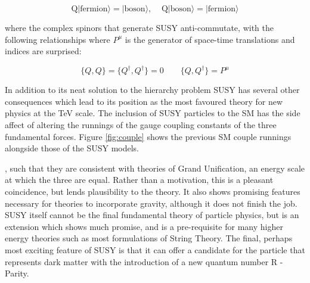 \begin{equation}
\textrm{Q}|\textrm{fermion}\rangle = |\textrm{boson}\rangle,  \; \; \; \;  \textrm{Q}|\textrm{boson}\rangle = |\textrm{fermion}\rangle  
\label{eqn:Q}
\end{equation}

where the complex spinors that generate SUSY anti-commutate, with the following relationships where $P^{\mu}$ is the generator of space-time translations and indices are surprised:


\begin{equation}
\{Q,Q\} = \{Q^{\dagger},Q^{\dagger}\} = 0 \qquad \{Q,Q^{\dagger}\} = P^{\mu} 
\end{equation} 


In addition to its neat solution to the hierarchy problem SUSY has several other consequences which lead to its position as the most favoured theory for new physics at the TeV scale. The inclusion of SUSY particles to the SM has the side affect of altering the runnings of the gauge coupling constants of the three fundamental forces. Figure \ref{fig:couple} shows the previous SM couple runnings alongside those of the SUSY models. 

, such that they are consistent with theories of Grand Unification, an energy scale at which the three are equal. Rather than a motivation, this is a pleasant coincidence, but lends plausibility to the theory. It also shows promising features necessary for theories to incorporate gravity, although it does not finish the job. SUSY itself cannot be the final fundamental theory of particle physics, but is an extension which shows much promise, and is a pre-requisite for many higher energy theories such as most formulations of String Theory\cite{Dine}. The final, perhaps most exciting feature of SUSY is that it can offer a candidate for the particle that represents dark matter with the introduction of a new quantum number R - Parity. 

